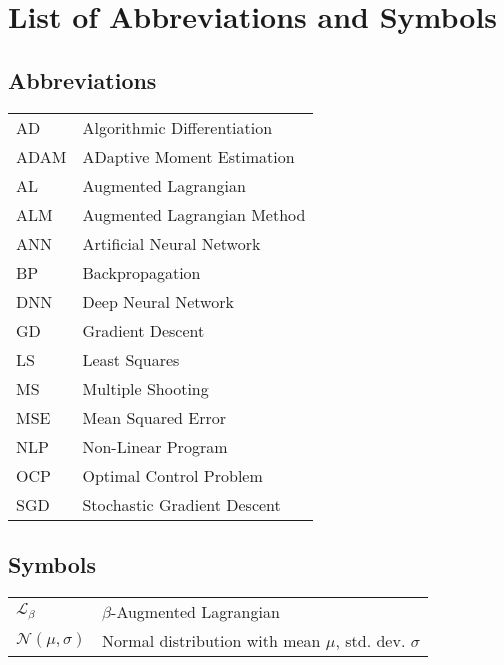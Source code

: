 \documentclass[master=wit,english]{kulemt}
\begin{document}

\chapter{List of Abbreviations and Symbols}
\section*{Abbreviations}
\begin{flushleft}
  \renewcommand{\arraystretch}{1.1}
  \begin{tabularx}{\textwidth}{@{}p{12mm}X@{}}
  	AD & Algorithmic Differentiation \\
  	ADAM & ADaptive Moment Estimation \\
  	AL & Augmented Lagrangian \\
  	ALM & Augmented Lagrangian Method \\
  	ANN & Artificial Neural Network \\
  	BP & Backpropagation \\
  	DNN & Deep Neural Network \\
  	GD & Gradient Descent \\
  	LS & Least Squares \\
  	MS & Multiple Shooting \\
  	MSE & Mean Squared Error \\
  	NLP & Non-Linear Program \\
  	OCP & Optimal Control Problem \\
  	SGD & Stochastic Gradient Descent \\ 
  \end{tabularx}
\end{flushleft}
\section*{Symbols}
\begin{flushleft}
  \renewcommand{\arraystretch}{1.1}
  \begin{tabularx}{\textwidth}{@{}p{12mm}X@{}}
    $\mathcal{L}_{\beta}$   & $\beta$-Augmented Lagrangian \\
    $\mathcal{N}(\mu,\sigma)$ & Normal distribution with mean $\mu$, std. dev. $\sigma$
  \end{tabularx}
\end{flushleft}
\end{document}
